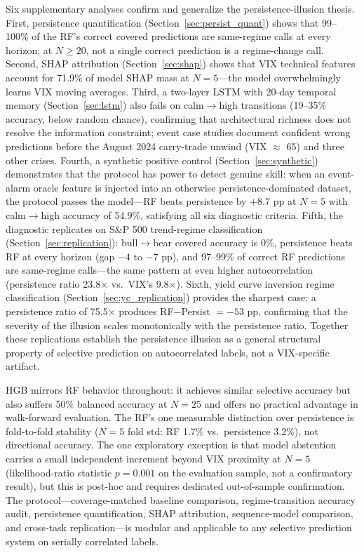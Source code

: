 \documentclass[11pt]{article}
\begin{document}
Six supplementary analyses confirm and generalize the persistence-illusion thesis. First, persistence quantification (Section~\ref{sec:persist_quant}) shows that 99--100\% of the RF's correct covered predictions are same-regime calls at every horizon; at $N \geq 20$, not a single correct prediction is a regime-change call. Second, SHAP attribution (Section~\ref{sec:shap}) shows that VIX technical features account for 71.9\% of model SHAP mass at $N = 5$---the model overwhelmingly learns VIX moving averages. Third, a two-layer LSTM with 20-day temporal memory (Section~\ref{sec:lstm}) also fails on calm$\to$high transitions (19--35\% accuracy, below random chance), confirming that architectural richness does not resolve the information constraint; event case studies document confident wrong predictions before the August 2024 carry-trade unwind (VIX $\approx$ 65) and three other crises. Fourth, a synthetic positive control (Section~\ref{sec:synthetic}) demonstrates that the protocol has power to detect genuine skill: when an event-alarm oracle feature is injected into an otherwise persistence-dominated dataset, the protocol passes the model---RF beats persistence by $+8.7$ pp at $N = 5$ with calm$\to$high accuracy of 54.9\%, satisfying all six diagnostic criteria. Fifth, the diagnostic replicates on S\&P 500 trend-regime classification (Section~\ref{sec:replication}): bull$\to$bear covered accuracy is 0\%, persistence beats RF at every horizon (gap $-4$ to $-7$ pp), and 97--99\% of correct RF predictions are same-regime calls---the same pattern at even higher autocorrelation (persistence ratio 23.8$\times$ vs.\ VIX's 9.8$\times$). Sixth, yield curve inversion regime classification (Section~\ref{sec:yc_replication}) provides the sharpest case: a persistence ratio of 75.5$\times$ produces RF$-$Persist $= -53$ pp, confirming that the severity of the illusion scales monotonically with the persistence ratio. Together these replications establish the persistence illusion as a general structural property of selective prediction on autocorrelated labels, not a VIX-specific artifact.

HGB mirrors RF behavior throughout: it achieves similar selective accuracy but also suffers 50\% balanced accuracy at $N = 25$ and offers no practical advantage in walk-forward evaluation. The RF's one measurable distinction over persistence is fold-to-fold stability ($N = 5$ fold std: RF 1.7\% vs.\ persistence 3.2\%), not directional accuracy. The one exploratory exception is that model abstention carries a small independent increment beyond VIX proximity at $N = 5$ (likelihood-ratio statistic $p = 0.001$ on the evaluation sample, not a confirmatory result), but this is post-hoc and requires dedicated out-of-sample confirmation. The protocol---coverage-matched baseline comparison, regime-transition accuracy audit, persistence quantification, SHAP attribution, sequence-model comparison, and cross-task replication---is modular and applicable to any selective prediction system on serially correlated labels.
\end{document}
